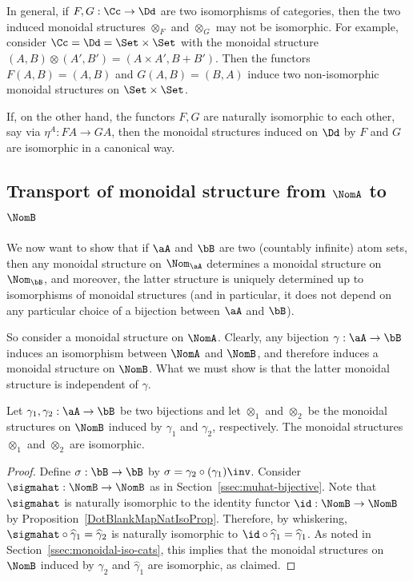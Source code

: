 \documentclass[twoside,11pt]{entics}
\begin{document}
In general, if $F,G:\Cc\to\Dd$ are two isomorphisms of categories,
then the two induced monoidal structures $\otimes_F$ and $\otimes_G$
may not be isomorphic. For example, consider $\Cc=\Dd=\Set\times\Set$ with
the monoidal structure $(A,B)\otimes(A',B')=(A\times A',B+B')$. Then
the functors $F(A,B)=(A,B)$ and $G(A,B)=(B,A)$ induce two
non-isomorphic monoidal structures on $\Set\times\Set$.

If, on the other hand, the functors $F,G$ are naturally isomorphic to
each other, say via $\eta^A:FA\to GA$, then the monoidal structures
induced on $\Dd$ by $F$ and $G$ are isomorphic in a canonical way.

\subsection{Transport of monoidal structure from $\NomA$ to $\NomB$}

We now want to show that if $\aA$ and $\bB$ are two (countably
infinite) atom sets, then any monoidal structure on $\Nom_{\aA}$
determines a monoidal structure on $\Nom_{\bB}$, and moreover, the
latter structure is uniquely determined up to isomorphisms of
monoidal structures (and in particular, it does not depend on any
particular choice of a bijection between $\aA$ and $\bB$).

So consider a monoidal structure on $\NomA$. Clearly, any bijection
$\gamma:\aA\to\bB$ induces an isomorphism between $\NomA$ and $\NomB$,
and therefore induces a monoidal structure on $\NomB$. What we must
show is that the latter monoidal structure is independent of $\gamma$.

\begin{xprop}\label{ISOProp}
Let $\gamma_1,\gamma_2:\aA\to \bB$ be two bijections and let
$\otimes_1$ and $\otimes_2$ be the monoidal structures on $\NomB$
induced by $\gamma_1$ and $\gamma_2$, respectively.  The monoidal structures $\otimes_1$ and $\otimes_2$ are isomorphic.
\end{xprop}

\begin{proof}
  Define $\sigma:\bB \to \bB$ by $\sigma=\gamma_2\circ (\gamma_1)\inv$.
  Consider $\sigmahat:\NomB\to\NomB$ as in
  Section~\ref{ssec:muhat-bijective}. Note that $\sigmahat$ is naturally
  isomorphic to the identity functor $\id:\NomB\to\NomB$ by
  Proposition~\ref{DotBlankMapNatIsoProp}. Therefore, by whiskering,
  $\sigmahat\circ\widehat\gamma_1=\widehat\gamma_2$ is naturally isomorphic
  to $\id\circ\widehat\gamma_1=\widehat\gamma_1$. As noted in
  Section~\ref{ssec:monoidal-iso-cats}, this implies that the monoidal
  structures on $\NomB$ induced by $\widehat\gamma_2$ and
  $\widehat\gamma_1$ are isomorphic, as claimed.
\end{proof}
\end{document}
